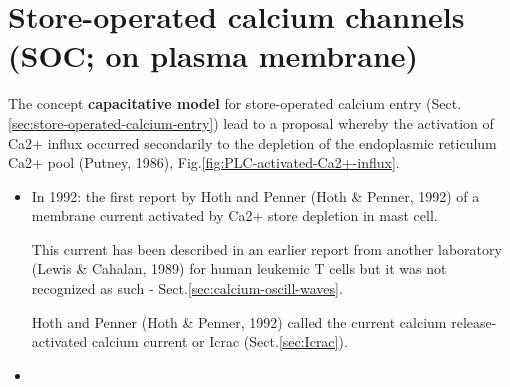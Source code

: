\chapter{Store-operated calcium channels (SOC; on plasma membrane)}
\label{sec:store-operated-calcium-channel}
\label{sec:SOC}
\label{sec:capacitative-calcium-entry}


The concept {\bf capacitative model} for store-operated calcium entry
(Sect.\ref{sec:store-operated-calcium-entry}) lead to a proposal whereby the
activation of Ca2+ influx occurred secondarily to the depletion of the
endoplasmic reticulum Ca2+ pool (Putney, 1986),
Fig.\ref{fig:PLC-activated-Ca2+-influx}.
\begin{itemize}
  \item  In 1992: the first report by Hoth and Penner (Hoth \& Penner, 1992) of
  a membrane current activated by Ca2+ store depletion in mast cell.

This current has been described in an earlier report from another laboratory
(Lewis \& Cahalan, 1989) for human leukemic T cells but it was not recognized as
such - Sect.\ref{sec:calcium-oscill-waves}.

Hoth and Penner (Hoth \& Penner, 1992) called the current calcium
release-activated calcium current or Icrac (Sect.\ref{sec:Icrac}).

  \item 
\end{itemize}


